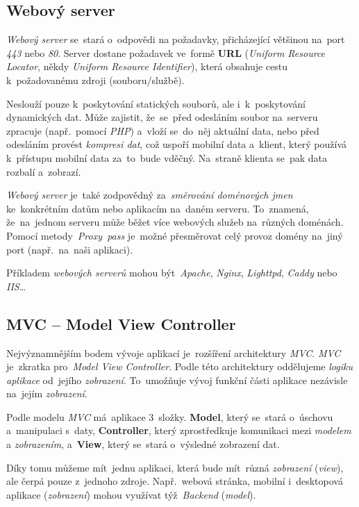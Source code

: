 \documentclass[10pt,a4paper]{article}
\begin{document}
        \subsection{Webový server}
        \emph{Webový server} se~stará o~odpovědi na požadavky, přicházející většinou na~port \emph{443} nebo \emph{80}. Server dostane požadavek ve~formě \textbf{URL} (\emph{Uniform Resource Locator}, někdy \emph{Uniform Resource Identifier}), která obsahuje cestu k~požadovanému zdroji (souboru/službě).

        Neslouží pouze k~poskytování statických souborů, ale i~k~poskytování dynamických dat. Může zajistit, že~se~před odesláním soubor na~serveru zpracuje (např.~pomocí \emph{PHP}) a~vloží se~do~něj aktuální data, nebo před odesláním provést \emph{kompresi dat}, což uspoří mobilní data a~klient, který používá k~přístupu mobilní data za~to~bude vděčný. Na~straně klienta se~pak data rozbalí a~zobrazí.

        \emph{Webový server} je~také zodpovědný za~\emph{směrování doménových jmen} ke~konkrétním datům nebo aplikacím na~daném serveru. To~znamená, že~na~jednom serveru může běžet více webových služeb na~různých doménách. Pomocí metody~\emph{Proxy~pass} je~možné přesměrovat celý provoz domény na~jiný port (např.~na~naši aplikaci). \cite{webserver:mdn}

        Příkladem \emph{webových serverů} mohou být~\emph{Apache}, \emph{Nginx}, \emph{Lighttpd}, \emph{Caddy} nebo \emph{IIS}\dots
        
        \subsection{MVC -- Model View Controller}
        Nejvýznamnějším bodem vývoje aplikací je~rozšíření architektury \emph{MVC}. \emph{MVC} je~zkratka pro~\emph{Model View Controller}. Podle této architektury oddělujeme \emph{logiku aplikace} od~jejího \emph{zobrazení}. To~umožňuje vývoj funkční části aplikace nezávisle na~jejím \emph{zobrazení}.

        Podle modelu \emph{MVC} má~aplikace 3~složky. \textbf{Model}, který se~stará o~úschovu a~manipulaci s~daty, \textbf{Controller}, který zprostředkuje komunikaci mezi \emph{modelem} a \emph{zobrazením}, a~\textbf{View}, který se~stará o~výsledné zobrazení dat. \cite{MVC}
        
        Díky tomu můžeme mít~jednu aplikaci, která bude mít~různá \emph{zobrazení} (\emph{view}), ale čerpá pouze z~jednoho zdroje. Např.~webová stránka, mobilní i~desktopová aplikace (\emph{zobrazení}) mohou využívat týž~\emph{Backend} (\emph{model}).
        
\end{document}
